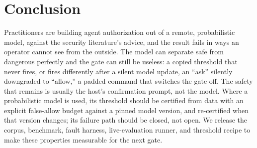 \documentclass[conference]{IEEEtran}
\begin{document}
\section{Conclusion}
Practitioners are building agent authorization out of a remote, probabilistic model, against
the security literature's advice, and the result fails in ways an operator cannot see from
the outside. The model can separate safe from dangerous perfectly and the gate can still be
useless: a copied threshold that never fires, or fires differently after a silent model update, an ``ask'' silently downgraded to ``allow,'' a
padded command that switches the gate off. The safety that remains is usually the host's
confirmation prompt, not the model. Where a probabilistic model is used, its threshold should
be certified from data with an explicit false-allow budget against a pinned model version,
and re-certified when that version changes; its failure path should be closed, not open. We release the corpus, benchmark, fault harness, live-evaluation runner,
and threshold recipe to make these properties measurable for the next gate.




\end{document}
